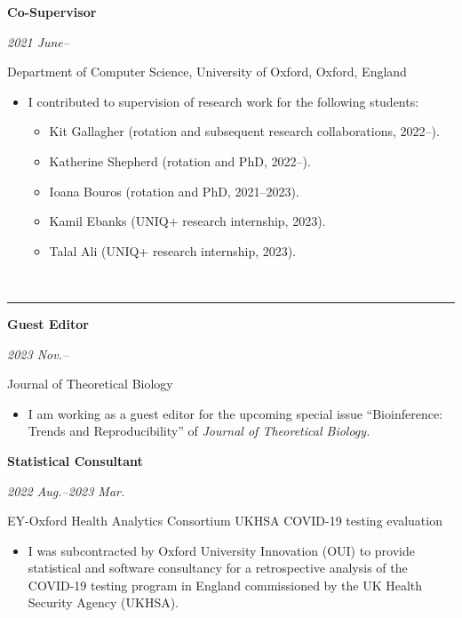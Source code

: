 \documentclass[10pt]{article}
\begin{document}
\vspace{0.2cm}

\clearpage


\noindent\parbox{.65\textwidth}{\raggedright  \textbf{Co-Supervisor}}
\parbox{.35\textwidth}{\raggedleft \emph{2021 June--}}
Department of Computer Science, University of Oxford, Oxford, England
\begin{itemize}
\setlength{\itemsep}{0pt}
\item I contributed to supervision of research work for the following students:
\begin{itemize}
\item Kit Gallagher (rotation and subsequent research collaborations, 2022--).
\item Katherine Shepherd (rotation and PhD, 2022--).
\item Ioana Bouros (rotation and PhD, 2021--2023).
\item Kamil Ebanks (UNIQ+ research internship, 2023).
\item Talal Ali (UNIQ+ research internship, 2023).
\end{itemize}
\end{itemize}







\vspace{0.6cm}





\vspace{-2.75mm} \\
\rule{\textwidth}{0.4pt}
\vspace{0.1mm}
\noindent\parbox{.65\textwidth}{\raggedright  \textbf{Guest Editor}}
\parbox{.35\textwidth}{\raggedleft \emph{2023 Nov.--}}
Journal of Theoretical Biology
\vspace{-.2cm}
\begin{itemize}
\setlength{\itemsep}{0pt}
\item I am working as a guest editor for the upcoming special issue ``Bioinference: Trends and Reproducibility'' of \emph{Journal of Theoretical Biology.}
\end{itemize}

\vspace{0.2cm}




\noindent\parbox{.65\textwidth}{\raggedright  \textbf{Statistical Consultant}}
\parbox{.35\textwidth}{\raggedleft \emph{2022 Aug.--2023 Mar.}}
EY-Oxford Health Analytics Consortium UKHSA COVID-19 testing evaluation
\vspace{-.2cm}
\begin{itemize}
\setlength{\itemsep}{0pt}
\item I was subcontracted by Oxford University Innovation (OUI) to provide statistical and software consultancy for a retrospective analysis of the COVID-19 testing program in England commissioned by the UK Health Security Agency (UKHSA).
\end{itemize}
\end{document}
